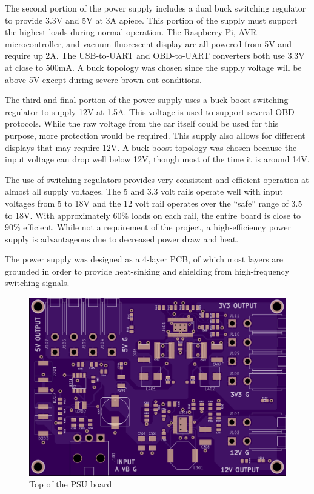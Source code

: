 The second portion of the power supply includes a dual buck switching regulator
to provide 3.3V and 5V at 3A apiece.  This portion of the supply must support 
the highest loads during normal operation.  The Raspberry Pi, AVR 
microcontroller, and vacuum-fluorescent display are all powered from 5V and 
require up 2A.  The USB-to-UART \cite{ft2232hds} and OBD-to-UART \cite{stn1110ds} converters both use 3.3V at 
close to 500mA.  A buck topology was chosen since the supply voltage will be
above 5V except during severe brown-out conditions.

The third and final portion of the power supply uses a buck-boost switching
regulator \cite{ltc3115ds} to supply 12V at 1.5A.  This voltage is used to support several
OBD protocols.  While the raw voltage from the car itself could be used
for this purpose, more protection would be required.  This supply also allows
for different displays that may require 12V.  A buck-boost topology was chosen
because the input voltage can drop well below 12V, though most of the time it is
around 14V.

The use of switching regulators provides very consistent and efficient operation
at almost all supply voltages.  The 5 and 3.3 volt rails operate well with input
voltages from 5 to 18V and the 12 volt rail operates over the ``safe'' range of
3.5 to 18V.  With approximately 60\% loads on each rail, the entire board is close
to 90\% efficient.  While not a requirement of the project, a high-efficiency power
supply is advantageous due to decreased power draw and heat.

The power supply was
designed as a 4-layer PCB, of which most layers are grounded in order to provide 
heat-sinking and shielding from high-frequency switching signals.

\begin{figure}[h]
\includegraphics[width=\textwidth]{img/psu_render_top.png}
\caption{Top of the PSU board}
\label{fig:psu render}
\end{figure}

